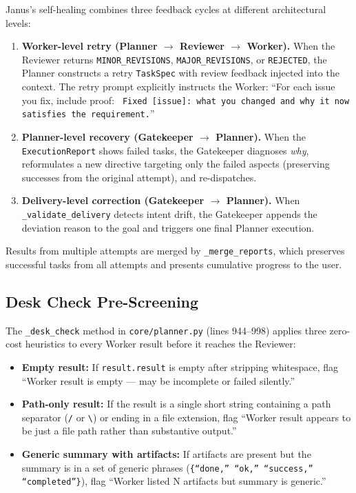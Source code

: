 \documentclass[11pt,a4paper]{article}
\begin{document}
Janus's self-healing combines three feedback cycles at different architectural
levels:

\begin{enumerate}[leftmargin=*,itemsep=2pt]
    \item \textbf{Worker-level retry (Planner $\rightarrow$ Reviewer
    $\rightarrow$ Worker).} When the Reviewer returns
    \texttt{MINOR\_REVISIONS}, \texttt{MAJOR\_REVISIONS}, or
    \texttt{REJECTED}, the Planner constructs a retry \texttt{TaskSpec} with
    review feedback injected into the context. The retry prompt explicitly
    instructs the Worker: ``For each issue you fix, include proof:
    \texttt{\checkmark\ Fixed [issue]: what you changed and why it now
    satisfies the requirement.}''

    \item \textbf{Planner-level recovery (Gatekeeper $\rightarrow$ Planner).}
    When the \texttt{ExecutionReport} shows failed tasks, the Gatekeeper
    diagnoses \emph{why}, reformulates a new directive targeting only the
    failed aspects (preserving successes from the original attempt), and
    re-dispatches.

    \item \textbf{Delivery-level correction (Gatekeeper $\rightarrow$
    Planner).} When \texttt{\_validate\_delivery} detects intent drift, the
    Gatekeeper appends the deviation reason to the goal and triggers one
    final Planner execution.
\end{enumerate}

Results from multiple attempts are merged by \texttt{\_merge\_reports}, which
preserves successful tasks from all attempts and presents cumulative progress
to the user.

\subsection{Desk Check Pre-Screening}

The \texttt{\_desk\_check} method in \texttt{core/planner.py} (lines 944--998)
applies three zero-cost heuristics to every Worker result before it reaches
the Reviewer:

\begin{itemize}[leftmargin=*,itemsep=2pt]
    \item \textbf{Empty result:} If \texttt{result.result} is empty after
    stripping whitespace, flag ``Worker result is empty --- may be incomplete
    or failed silently.''
    \item \textbf{Path-only result:} If the result is a single short string
    containing a path separator (\texttt{/} or \texttt{\textbackslash}) or
    ending in a file extension, flag ``Worker result appears to be just a
    file path rather than substantive output.''
    \item \textbf{Generic summary with artifacts:} If artifacts are present
    but the summary is in a set of generic phrases (\texttt{\{``done,''
    ``ok,'' ``success,'' ``completed''\}}), flag ``Worker listed N artifacts
    but summary is generic.''
\end{itemize}
\end{document}
